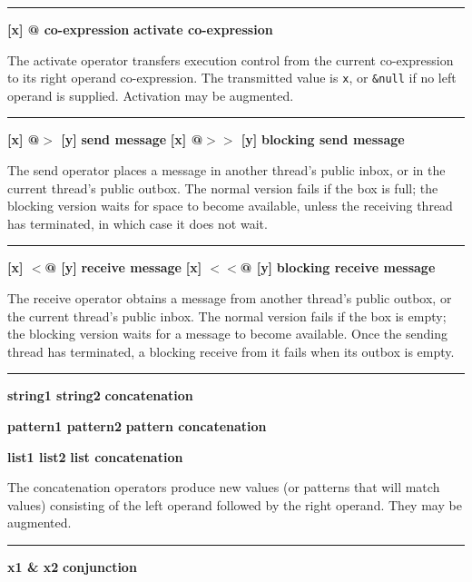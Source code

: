 \bigskip\hrule\vspace{0.1cm}
\noindent
{\bf [x] @ co-expression } \hfill {\bf activate co-expression}

\noindent
The activate operator transfers execution
control from the current co-expression to its right operand
co-expression. The transmitted value is \texttt{x}, or \texttt{\&null}
if no left operand is supplied. Activation may be augmented.

\bigskip\hrule\vspace{0.1cm}
\noindent
{\bf [x] @$>$ [y] } \hfill {\bf send message}
 \linebreak
\noindent
{\bf [x] @$>>$ [y] } \hfill {\bf blocking send message}

\noindent
The send operator places a message in another thread's public
inbox, or in the current thread's public outbox. The normal version fails
if the box is full; the blocking version waits for space to become
available, unless the receiving thread has terminated, in which case it
does not wait.

\bigskip\hrule\vspace{0.1cm}
\noindent
{\bf [x] $<$@ [y] } \hfill {\bf receive message}
 \linebreak
\noindent
{\bf [x] $<<$@ [y] } \hfill {\bf blocking receive message}

\noindent
The receive operator obtains a message from another thread's public
outbox, or the current thread's public inbox. The normal version fails
if the box is empty; the blocking version waits for a message to become
available. Once the sending thread has terminated, a blocking receive
from it fails when its outbox is empty.

\bigskip\hrule\vspace{0.1cm}
\noindent
{\bf string1 {\textbar}{\textbar} string2 } \hfill {\bf concatenation}

\noindent
{\bf pattern1 {\textbar}{\textbar} pattern2 } \hfill {\bf pattern concatenation}

\noindent
{\bf list1 {\textbar}{\textbar}{\textbar} list2 } \hfill {\bf list concatenation}

\noindent
The concatenation operators produce new values
(or patterns that will match values)
consisting of the left operand followed by the right
operand. They may be augmented.

\bigskip\hrule\vspace{0.1cm}
\noindent
{\bf x1 \& x2 } \hfill {\bf conjunction}

